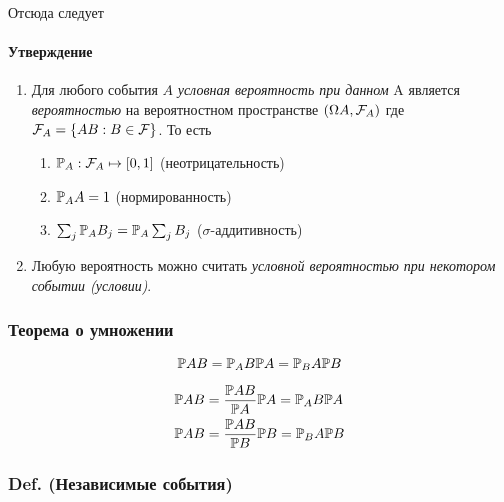Отсюда следует

\paragraph{Утверждение}\label{ux443ux442ux432ux435ux440ux436ux434ux435ux43dux438ux435}

\begin{enumerate}
\def\labelenumi{\arabic{enumi}.}

\item
  Для любого события \(A\) \emph{условная вероятность при данном} A
  является \emph{вероятностью} на вероятностном пространстве
  \((\Omega A, \mathcal F_A)\) где
  \(\mathcal F_A = \{ A B : B \in\mathcal F \}\). То есть

  \begin{enumerate}
  \def\labelenumii{\arabic{enumii}.}
  
  \item
    \(\mathbb P_A : \mathcal F_A\mapsto [0,1]\) (неотрицательность)
  \item
    \(\mathbb P_A A = 1\) (нормированность)
  \item
    \(\sum_j \mathbb P_A B_j = \mathbb P_A \sum_j B_j\) (\(\sigma\)-аддитивность)
  \end{enumerate}
\item
  Любую вероятность можно считать \emph{условной вероятностью при
  некотором событии (условии)}.
\end{enumerate}

\subsubsection{Теорема о
умножении}\label{ux442ux435ux43eux440ux435ux43cux430-ux43e-ux443ux43cux43dux43eux436ux435ux43dux438ux438}

\[ \mathbb P AB = \mathbb P_A B \mathbb P A  = \mathbb P_B A \mathbb P B\]

\[\begin{aligned}
& \mathbb P AB = \frac{\mathbb P AB}{\mathbb P A} \mathbb P A = \mathbb P_A B \mathbb P A \\
& \mathbb P AB = \frac{\mathbb P AB}{\mathbb P B} \mathbb P B = \mathbb P_B A \mathbb P B
\end{aligned}\]

\subsubsection{Def. (Независимые
события)}\label{def.-ux43dux435ux437ux430ux432ux438ux441ux438ux43cux44bux435-ux441ux43eux431ux44bux442ux438ux44f}


